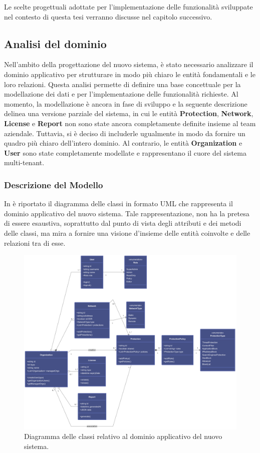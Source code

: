 Le scelte progettuali adottate per l'implementazione delle funzionalità sviluppate nel contesto di questa tesi verranno discusse nel capitolo successivo.

\subsection{Analisi del dominio}
Nell'ambito della progettazione del nuovo sistema, è stato necessario analizzare il dominio applicativo per strutturare in modo più chiaro le entità fondamentali e le loro relazioni. Questa analisi permette di definire una base concettuale per la modellazione dei dati e per l'implementazione delle funzionalità richieste. Al momento, la modellazione è ancora in fase di sviluppo e la seguente descrizione delinea una versione parziale del sistema, in cui le entità \textbf{Protection}, \textbf{Network}, \textbf{License} e \textbf{Report} non sono state ancora completamente definite insieme al team aziendale. Tuttavia, si è deciso di includerle ugualmente in modo da fornire un quadro più chiaro dell'intero dominio. Al contrario, le entità \textbf{Organization} e \textbf{User} sono state completamente modellate e rappresentano il cuore del sistema multi-tenant.

\subsubsection{Descrizione del Modello}
In  è riportato il diagramma delle classi in formato UML che rappresenta il dominio applicativo del nuovo sistema. Tale rappresentazione, non ha la pretesa di essere esaustiva, soprattutto dal punto di vista degli attributi e dei metodi delle classi, ma mira a fornire una visione d'insieme delle entità coinvolte e delle relazioni tra di esse.

\begin{figure}
  \centering
  \includegraphics[width=1\textwidth]{./figures/nuovo-cloud-model.png}
  \caption{Diagramma delle classi relativo al dominio applicativo del nuovo sistema.}
  \label{fig:domain_model}
\end{figure}

